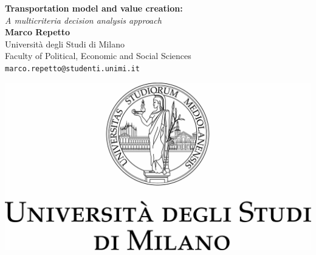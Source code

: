 \documentclass[a0,portrait]{a0poster}
\begin{document}
\begin{minipage}[b]{0.75\linewidth}
\veryHuge \textbf{Transportation model and value
creation:} \color{Black}\\ %
\Huge\textit{ A multicriteria decision
analysis approach}\\[2cm] %
\huge \textbf{Marco Repetto}\\[0.5cm] %
\huge Università degli Studi di Milano\\[0.4cm] %
\Large Faculty of Political, Economic and Social Sciences\\[0.4cm]
\Large \texttt{marco.repetto@studenti.unimi.it}\\
\end{minipage}
%
\begin{minipage}[b]{0.25\linewidth}
\includegraphics[width=20cm]{logo}\\
\end{minipage}

\vspace{1cm} %

\end{document}
